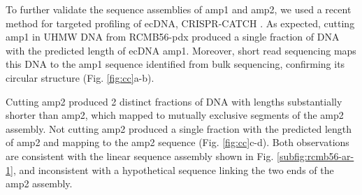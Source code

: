 To further validate the sequence assemblies of amp1 and amp2, we used a recent method for targeted profiling of ecDNA, CRISPR-CATCH \cite{crispr-catch}. As expected, cutting amp1 in UHMW DNA from RCMB56-pdx produced a single fraction of DNA with the predicted length of ecDNA amp1. Moreover, short read sequencing maps this DNA to the amp1 sequence identified from bulk sequencing, confirming its circular structure  (Fig. \ref{fig:cc}a-b). 

Cutting amp2 produced 2 distinct fractions of DNA with lengths substantially shorter than amp2, which mapped to mutually exclusive segments of the amp2 assembly. Not cutting amp2 produced a single fraction with the predicted length of amp2 and mapping to the amp2 sequence (Fig. \ref{fig:cc}c-d). Both observations are consistent with the linear sequence assembly shown in Fig. \ref{subfig:rcmb56-ar-1}, and inconsistent with a hypothetical sequence linking the two ends of the amp2 assembly.

